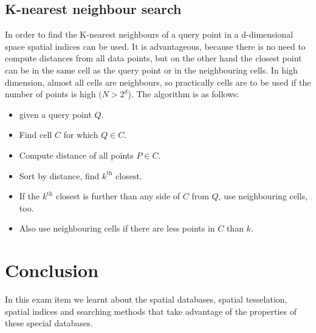\documentclass[12pt]{article}
\theoremstyle{plain}
\begin{document}
\subsection{K-nearest neighbour search}

In order to find the K-nearest neighbours of a query point in a d-dimensional space spatial indices can be used. It is advantageous, because there is no need to compute distances from all data points, but on the other hand the closest point can be in the same cell as the query point or in the neighbouring cells. In high dimension, almost all cells are neighbours, so practically cells are to be used if the number of points is high ($N > 2^d$). The algorithm is as follows:

\begin{itemize}
	\item given a query point $Q$.
	\item Find cell $C$ for which $Q \in C$.
	\item Compute distance of all points $P \in C$. 
	\item Sort by distance, find $k^{\text{th}}$ closest.
	\item If the $k^{\text{th}}$ closest is further than any side of $C$ from $Q$, use neighbouring cells, too. 
	\item Also use neighbouring cells if there are less points in $C$ than $k$.
\end{itemize}


\section{Conclusion}

In this exam item we learnt about the spatial databases, spatial tesselation, spatial indices and searching methods that take advantage of the properties of these special databases.

\newpage
\end{document}

